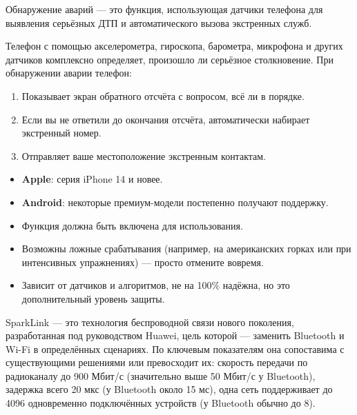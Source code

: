 
Обнаружение аварий — это функция, использующая датчики телефона для выявления серьёзных ДТП и автоматического вызова экстренных служб.


Телефон с помощью акселерометра, гироскопа, барометра, микрофона и других датчиков комплексно определяет, произошло ли серьёзное столкновение. При обнаружении аварии телефон:

\begin{enumerate}
  \item Показывает экран обратного отсчёта с вопросом, всё ли в порядке.
  \item Если вы не ответили до окончания отсчёта, автоматически набирает экстренный номер.
  \item Отправляет ваше местоположение экстренным контактам.
\end{enumerate}


\begin{itemize}
  \item \textbf{Apple}: серия iPhone 14 и новее.
  \item \textbf{Android}: некоторые премиум-модели постепенно получают поддержку.
\end{itemize}


\begin{itemize}
  \item Функция должна быть включена для использования.
  \item Возможны ложные срабатывания (например, на американских горках или при интенсивных упражнениях) — просто отмените вовремя.
  \item Зависит от датчиков и алгоритмов, не на 100\% надёжна, но это дополнительный уровень защиты.
\end{itemize}


SparkLink — это технология беспроводной связи нового поколения, разработанная под руководством Huawei, цель которой — заменить Bluetooth и Wi-Fi в определённых сценариях. По ключевым показателям она сопоставима с существующими решениями или превосходит их: скорость передачи по радиоканалу до 900 Мбит/с (значительно выше 50 Мбит/с у Bluetooth), задержка всего 20 мкс (у Bluetooth около 15 мс), одна сеть поддерживает до 4096 одновременно подключённых устройств (у Bluetooth обычно до 8).

